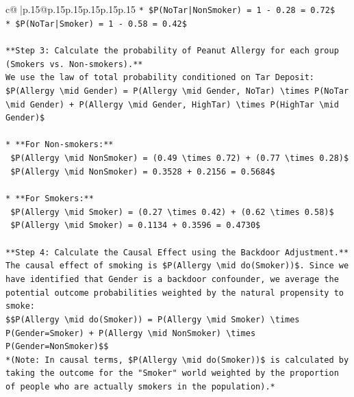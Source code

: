 \documentclass{article}
\begin{document}
{\begin{supertabular}{c@{$\;$}|p{.15\linewidth}@{}p{.15\linewidth}p{.15\linewidth}p{.15\linewidth}p{.15\linewidth}p{.15\linewidth}}
{{{\texttt{*   \$P(NoTar|NonSmoker) = 1 {-} 0.28 = 0.72\$} \\
\texttt{*   \$P(NoTar|Smoker) = 1 {-} 0.58 = 0.42\$} \\
\\ 
\texttt{**Step 3: Calculate the probability of Peanut Allergy for each group (Smokers vs. Non{-}smokers).**} \\
\texttt{We use the law of total probability conditioned on Tar Deposit:} \\
\texttt{\$P(Allergy \textbackslash{}mid Gender) = P(Allergy \textbackslash{}mid Gender, NoTar) \textbackslash{}times P(NoTar \textbackslash{}mid Gender) + P(Allergy \textbackslash{}mid Gender, HighTar) \textbackslash{}times P(HighTar \textbackslash{}mid Gender)\$} \\
\\ 
\texttt{*   **For Non{-}smokers:**} \\
\texttt{    \$P(Allergy \textbackslash{}mid NonSmoker) = (0.49 \textbackslash{}times 0.72) + (0.77 \textbackslash{}times 0.28)\$} \\
\texttt{    \$P(Allergy \textbackslash{}mid NonSmoker) = 0.3528 + 0.2156 = 0.5684\$} \\
\\ 
\texttt{*   **For Smokers:**} \\
\texttt{    \$P(Allergy \textbackslash{}mid Smoker) = (0.27 \textbackslash{}times 0.42) + (0.62 \textbackslash{}times 0.58)\$} \\
\texttt{    \$P(Allergy \textbackslash{}mid Smoker) = 0.1134 + 0.3596 = 0.4730\$} \\
\\ 
\texttt{**Step 4: Calculate the Causal Effect using the Backdoor Adjustment.**} \\
\texttt{The causal effect of smoking is \$P(Allergy \textbackslash{}mid do(Smoker))\$. Since we have identified that Gender is a backdoor confounder, we average the potential outcome probabilities weighted by the natural propensity to smoke:} \\
\texttt{\$\$P(Allergy \textbackslash{}mid do(Smoker)) = P(Allergy \textbackslash{}mid Smoker) \textbackslash{}times P(Gender=Smoker) + P(Allergy \textbackslash{}mid NonSmoker) \textbackslash{}times P(Gender=NonSmoker)\$\$} \\
\texttt{*(Note: In causal terms, \$P(Allergy \textbackslash{}mid do(Smoker))\$ is calculated by taking the outcome for the "Smoker" world weighted by the proportion of people who are actually smokers in the population).*} \\
}}}
\end{supertabular}}
\end{document}
